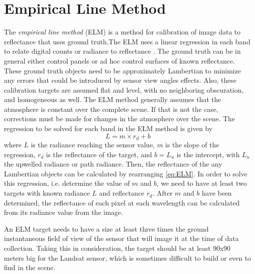 \section{Empirical Line Method}
\label{subsec:ELM}
The {\it empirical line method} (ELM) is a method for calibration of image data to reflectance that uses ground truth.The ELM uses a linear regression in each band to relate digital counts or radiance to reflectance \cite{Schott}. The ground truth can be in general  either control panels or ad hoc control surfaces of known reflectance. These ground truth objects need to be approximately Lambertian to minimize any errors that could be introduced by sensor view angles effects. Also, these calibration targets are assumed flat and level, with no neighboring obscuration, and homogeneous as well. The ELM method generally assumes that the atmosphere is constant over the complete scene. If that is not the case, corrections must be made for changes in the atmosphere over the scene. The regression to be solved for each band in the ELM method is given by
\begin{equation}
	\label{eq:ELM} 
	L = m\times r_d + b
\end{equation}
where $L$ is the radiance reaching the sensor value, $m$ is the slope of the regression, $r_d$ is the reflectance of the target, and $b=L_u$ is the intercept, with $L_u$ the upwelled radiance or path radiance. Then, the reflectance of the any Lambertian objects can be calculated by rearranging \autoref{eq:ELM}. In order to solve this regression, i.e. determine the value of $m$ and $b$, we need to have at least two targets with known radiance $L$ and reflectance $r_d$. After $m$ and $b$ have been determined, the reflectance of each pixel at each wavelength can be calculated from its radiance value from the image.

An ELM target needs to have a size at least three times the ground instantaneous field of view of the sensor that will image it at the time of data collection. Taking this in consideration, the target should be at least 90x90 meters big for the Landsat sensor, which is sometimes difficult to build or even to find in the scene. 



